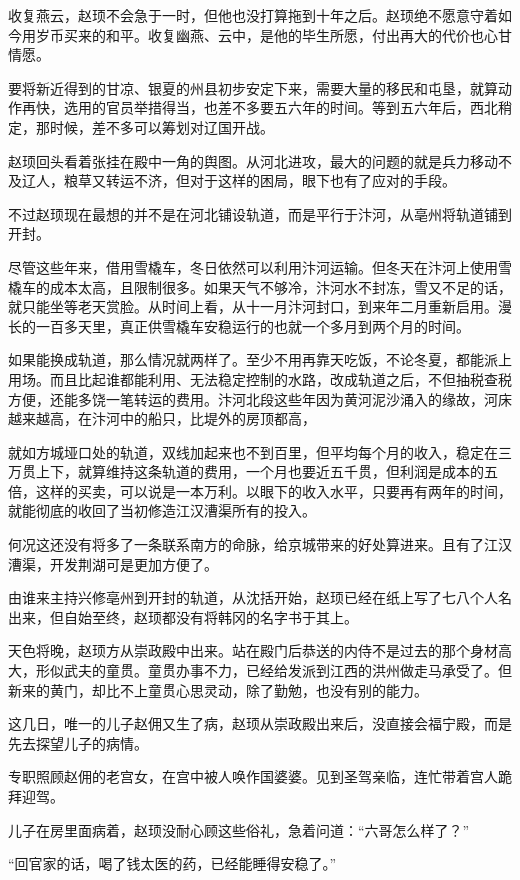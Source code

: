 收复燕云，赵顼不会急于一时，但他也没打算拖到十年之后。赵顼绝不愿意守着如今用岁币买来的和平。收复幽燕、云中，是他的毕生所愿，付出再大的代价也心甘情愿。 

要将新近得到的甘凉、银夏的州县初步安定下来，需要大量的移民和屯垦，就算动作再快，选用的官员举措得当，也差不多要五六年的时间。等到五六年后，西北稍定，那时候，差不多可以筹划对辽国开战。 

赵顼回头看着张挂在殿中一角的舆图。从河北进攻，最大的问题的就是兵力移动不及辽人，粮草又转运不济，但对于这样的困局，眼下也有了应对的手段。 

不过赵顼现在最想的并不是在河北铺设轨道，而是平行于汴河，从亳州将轨道铺到开封。 

尽管这些年来，借用雪橇车，冬日依然可以利用汴河运输。但冬天在汴河上使用雪橇车的成本太高，且限制很多。如果天气不够冷，汴河水不封冻，雪又不足的话，就只能坐等老天赏脸。从时间上看，从十一月汴河封口，到来年二月重新启用。漫长的一百多天里，真正供雪橇车安稳运行的也就一个多月到两个月的时间。 

如果能换成轨道，那么情况就两样了。至少不用再靠天吃饭，不论冬夏，都能派上用场。而且比起谁都能利用、无法稳定控制的水路，改成轨道之后，不但抽税查税方便，还能多饶一笔转运的费用。汴河北段这些年因为黄河泥沙涌入的缘故，河床越来越高，在汴河中的船只，比堤外的房顶都高， 

就如方城垭口处的轨道，双线加起来也不到百里，但平均每个月的收入，稳定在三万贯上下，就算维持这条轨道的费用，一个月也要近五千贯，但利润是成本的五倍，这样的买卖，可以说是一本万利。以眼下的收入水平，只要再有两年的时间，就能彻底的收回了当初修造江汉漕渠所有的投入。 

何况这还没有将多了一条联系南方的命脉，给京城带来的好处算进来。且有了江汉漕渠，开发荆湖可是更加方便了。 

由谁来主持兴修亳州到开封的轨道，从沈括开始，赵顼已经在纸上写了七八个人名出来，但自始至终，赵顼都没有将韩冈的名字书于其上。 

天色将晚，赵顼方从崇政殿中出来。站在殿门后恭送的内侍不是过去的那个身材高大，形似武夫的童贯。童贯办事不力，已经给发派到江西的洪州做走马承受了。但新来的黄门，却比不上童贯心思灵动，除了勤勉，也没有别的能力。 

这几日，唯一的儿子赵佣又生了病，赵顼从崇政殿出来后，没直接会福宁殿，而是先去探望儿子的病情。 

专职照顾赵佣的老宫女，在宫中被人唤作国婆婆。见到圣驾亲临，连忙带着宫人跪拜迎驾。 

儿子在房里面病着，赵顼没耐心顾这些俗礼，急着问道：“六哥怎么样了？” 

“回官家的话，喝了钱太医的药，已经能睡得安稳了。” 

